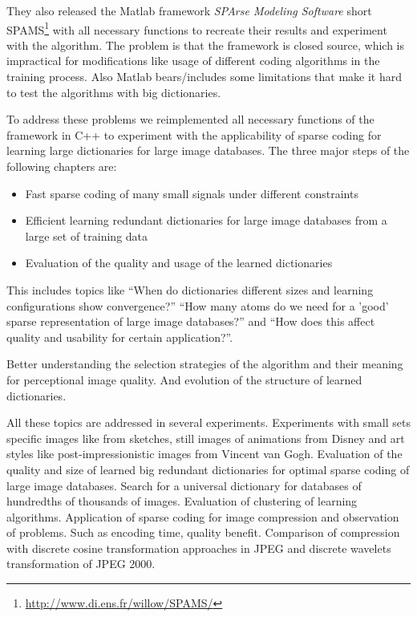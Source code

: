 They also released the Matlab framework \emph{SPArse Modeling Software}
short SPAMS\footnote{\url{http://www.di.ens.fr/willow/SPAMS/}} with all
necessary functions to recreate their results and experiment with the algorithm.
The problem is that the framework is closed source, which is impractical for
modifications like usage of different coding algorithms in the training process.
Also Matlab bears/includes some limitations that make it hard to test the
algorithms with big dictionaries.

To address these problems we reimplemented all necessary functions of the
framework in C++ to experiment with the applicability of sparse coding for
learning large dictionaries for large image databases. The three major steps of
the following chapters are:

\begin{itemize}
 \item Fast sparse coding of many small signals under different constraints
 \item Efficient learning redundant dictionaries for large image databases from
a large set of training data
 \item Evaluation of the quality and usage of the learned dictionaries
\end{itemize}

This includes topics like ``When do dictionaries different sizes and
learning configurations show convergence?'' ``How many atoms do we need for a
'good' sparse representation of large image databases?''  and ``How does this
affect quality and usability for certain application?''. 

Better understanding the selection strategies of the algorithm and their
meaning for perceptional image quality. And evolution of the structure of
learned dictionaries. 

All these topics are addressed in several experiments. Experiments with
small sets specific images like from sketches, still images of animations from
Disney and art styles like post-impressionistic images from Vincent van Gogh.
Evaluation of the quality and size of learned big redundant dictionaries for
optimal sparse coding of large image databases. Search for a universal
dictionary for databases of hundredths of thousands of images. Evaluation of
clustering of learning algorithms. Application of sparse coding for image
compression and observation of problems. Such as encoding time, quality benefit.
Comparison of compression with discrete cosine transformation approaches in JPEG
and discrete wavelets transformation of JPEG 2000.







